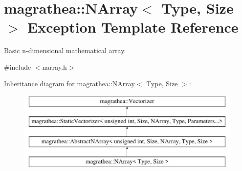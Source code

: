\hypertarget{exceptionmagrathea_1_1NArray}{\section{magrathea\-:\-:N\-Array$<$ Type, Size $>$ Exception Template Reference}
\label{exceptionmagrathea_1_1NArray}
}


Basic n-\/dimensional mathematical array.  




{\ttfamily \#include $<$narray.\-h$>$}

Inheritance diagram for magrathea\-:\-:N\-Array$<$ Type, Size $>$\-:\begin{figure}[H]
\begin{center}
\leavevmode
\includegraphics[height=4.000000cm]{exceptionmagrathea_1_1NArray}
\end{center}
\end{figure}
